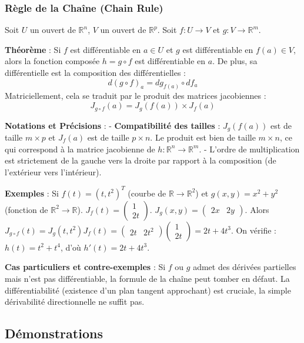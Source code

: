 \documentclass[11pt,a4paper]{article}
\begin{document}
\subsubsection{Règle de la Chaîne (Chain Rule)}

Soit $U$ un ouvert de $\mathbb{R}^n$, $V$ un ouvert de $\mathbb{R}^p$.
Soit $f : U \to V$ et $g : V \to \mathbb{R}^m$.

\textbf{Théorème} : Si $f$ est différentiable en $a \in U$ et $g$ est différentiable en $f(a) \in V$, alors la fonction composée $h = g \circ f$ est différentiable en $a$. De plus, sa différentielle est la composition des différentielles :
$$ d(g \circ f)_a = dg_{f(a)} \circ df_a $$
Matriciellement, cela se traduit par le produit des matrices jacobiennes :
$$ J_{g \circ f}(a) = J_g(f(a)) \times J_f(a) $$

\textbf{Notations et Précisions} :
- \textbf{Compatibilité des tailles} : $J_g(f(a))$ est de taille $m \times p$ et $J_f(a)$ est de taille $p \times n$. Le produit est bien de taille $m \times n$, ce qui correspond à la matrice jacobienne de $h : \mathbb{R}^n \to \mathbb{R}^m$.
- L'ordre de multiplication est strictement de la gauche vers la droite par rapport à la composition (de l'extérieur vers l'intérieur).

\textbf{Exemples} :
Si $f(t) = (t, t^2)^T$ (courbe de $\mathbb{R} \to \mathbb{R}^2$) et $g(x,y) = x^2 + y^2$ (fonction de $\mathbb{R}^2 \to \mathbb{R}$).
$J_f(t) = \begin{pmatrix} 1 \\ 2t \end{pmatrix}$. $J_g(x,y) = \begin{pmatrix} 2x & 2y \end{pmatrix}$.
Alors $J_{g \circ f}(t) = J_g(t, t^2) J_f(t) = \begin{pmatrix} 2t & 2t^2 \end{pmatrix} \begin{pmatrix} 1 \\ 2t \end{pmatrix} = 2t + 4t^3$.
On vérifie : $h(t) = t^2 + t^4$, d'où $h'(t) = 2t + 4t^3$.

\textbf{Cas particuliers et contre-exemples} :
Si $f$ ou $g$ admet des dérivées partielles mais n'est pas différentiable, la formule de la chaîne peut tomber en défaut. La différentiabilité (existence d'un plan tangent approchant) est cruciale, la simple dérivabilité directionnelle ne suffit pas.

\subsection{Démonstrations}
\end{document}
